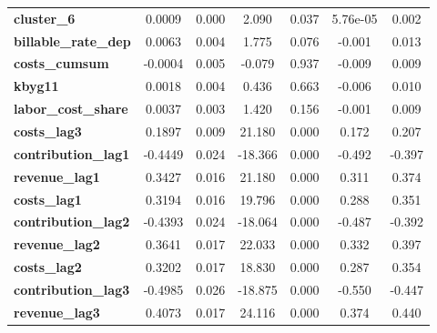 \begin{center}
\begin{tabular}{lcccccc}
\textbf{cluster\_6}                         &       0.0009  &        0.000     &     2.090  &         0.037        &     5.76e-05    &        0.002     \\
\textbf{billable\_rate\_dep}                &       0.0063  &        0.004     &     1.775  &         0.076        &       -0.001    &        0.013     \\
\textbf{costs\_cumsum}                      &      -0.0004  &        0.005     &    -0.079  &         0.937        &       -0.009    &        0.009     \\
\textbf{kbyg11}                             &       0.0018  &        0.004     &     0.436  &         0.663        &       -0.006    &        0.010     \\
\textbf{labor\_cost\_share}                 &       0.0037  &        0.003     &     1.420  &         0.156        &       -0.001    &        0.009     \\
\textbf{costs\_lag3}                        &       0.1897  &        0.009     &    21.180  &         0.000        &        0.172    &        0.207     \\
\textbf{contribution\_lag1}                 &      -0.4449  &        0.024     &   -18.366  &         0.000        &       -0.492    &       -0.397     \\
\textbf{revenue\_lag1}                      &       0.3427  &        0.016     &    21.180  &         0.000        &        0.311    &        0.374     \\
\textbf{costs\_lag1}                        &       0.3194  &        0.016     &    19.796  &         0.000        &        0.288    &        0.351     \\
\textbf{contribution\_lag2}                 &      -0.4393  &        0.024     &   -18.064  &         0.000        &       -0.487    &       -0.392     \\
\textbf{revenue\_lag2}                      &       0.3641  &        0.017     &    22.033  &         0.000        &        0.332    &        0.397     \\
\textbf{costs\_lag2}                        &       0.3202  &        0.017     &    18.830  &         0.000        &        0.287    &        0.354     \\
\textbf{contribution\_lag3}                 &      -0.4985  &        0.026     &   -18.875  &         0.000        &       -0.550    &       -0.447     \\
\textbf{revenue\_lag3}                      &       0.4073  &        0.017     &    24.116  &         0.000        &        0.374    &        0.440     \\

\end{tabular}
\end{center}
